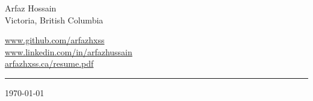 \documentclass[a4paper, 12pt, oneside]{letter}
\newcommand{\CustomRuler}{\vspace{0\baselineskip}\textcolor{black}{\rule{\linewidth}{0.5pt}}\vspace{-0.5\baselineskip}}
\begin{document}
\pagestyle{empty}

\noindent
\begin{minipage}[t]{0.5\textwidth}
	\raggedright
	\vspace{3pt}
	{\fontsize{30}{34}\selectfont Arfaz Hossain} \\
	\vspace{2pt}
	{\fontsize{12}{14}\selectfont Victoria, British Columbia}
\end{minipage}%
\begin{minipage}[t]{0.5\textwidth}
	\raggedleft
	\vspace{1pt}
	\href{https://www.github.com/arfazhxss}{\fontsize{12}{14}\selectfont www.github.com/arfazhxss} \\
	\href{https://www.linkedin.com/in/arfazhussain}{\fontsize{12}{14}\selectfont www.linkedin.com/in/arfazhussain} \\
	\href{https://arfazhxss.ca/resume.pdf}{\fontsize{12}{14}\selectfont arfazhxss.ca/resume.pdf}
\end{minipage}

\CustomRuler \vspace{20pt} \today \vspace{5pt}
\end{document}
